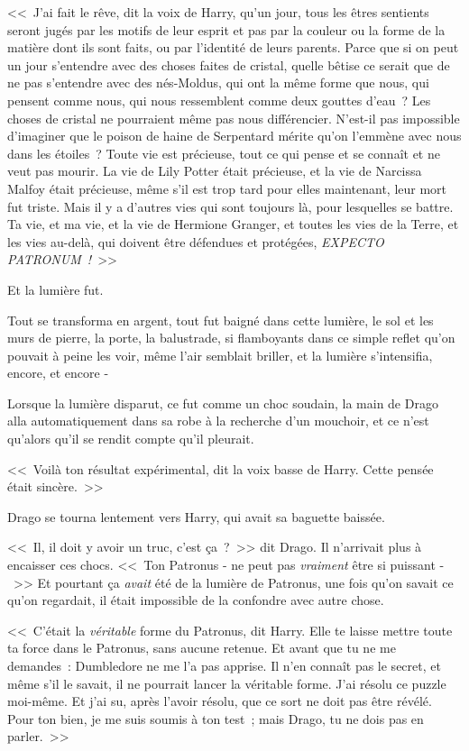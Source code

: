<<~J'ai fait le rêve, dit la voix de Harry, qu'un jour, tous les êtres sentients\footnotemark{} seront jugés par les motifs de leur esprit et pas par la couleur ou la forme de la matière dont ils sont faits, ou par l'identité de leurs parents. Parce que si on peut un jour s'entendre avec des choses faites de cristal, quelle bêtise ce serait que de ne pas s'entendre avec des nés-Moldus, qui ont la même forme que nous, qui pensent comme nous, qui nous ressemblent comme deux gouttes d'eau~? Les choses de cristal ne pourraient même pas nous différencier. N'est-il pas impossible d'imaginer que le poison de haine de Serpentard mérite qu'on l'emmène avec nous dans les étoiles~? Toute vie est précieuse, tout ce qui pense et se connaît et ne veut pas mourir. La vie de Lily Potter était précieuse, et la vie de Narcissa Malfoy était précieuse, même s'il est trop tard pour elles maintenant, leur mort fut triste. Mais il y a d'autres vies qui sont toujours là, pour lesquelles se battre. Ta vie, et ma vie, et la vie de Hermione Granger, et toutes les vies de la Terre, et les vies au-delà, qui doivent être défendues et protégées, \emph{EXPECTO PATRONUM~!}~>>

Et la lumière fut.

Tout se transforma en argent, tout fut baigné dans cette lumière, le sol et les murs de pierre, la porte, la balustrade, si flamboyants dans ce simple reflet qu'on pouvait à peine les voir, même l'air semblait briller, et la lumière s'intensifia, encore, et encore -

Lorsque la lumière disparut, ce fut comme un choc soudain, la main de Drago alla automatiquement dans sa robe à la recherche d'un mouchoir, et ce n'est qu'alors qu'il se rendit compte qu'il pleurait.

<<~Voilà ton résultat expérimental, dit la voix basse de Harry. Cette pensée était sincère.~>>

Drago se tourna lentement vers Harry, qui avait sa baguette baissée.

<<~Il, il doit y avoir un truc, c'est ça~?~>> dit Drago. Il n'arrivait plus à encaisser ces chocs. <<~Ton Patronus - ne peut pas \emph{vraiment} être si puissant -~>> Et pourtant ça \emph{avait} été de la lumière de Patronus, une fois qu'on savait ce qu'on regardait, il était impossible de la confondre avec autre chose.

<<~C'était la \emph{véritable} forme du Patronus, dit Harry. Elle te laisse mettre toute ta force dans le Patronus, sans aucune retenue. Et avant que tu ne me demandes~: Dumbledore ne me l'a pas apprise. Il n'en connaît pas le secret, et même s'il le savait, il ne pourrait lancer la véritable forme. J'ai résolu ce puzzle moi-même. Et j'ai su, après l'avoir résolu, que ce sort ne doit pas être révélé. Pour ton bien, je me suis soumis à ton test~; mais Drago, tu ne dois pas en parler.~>>

